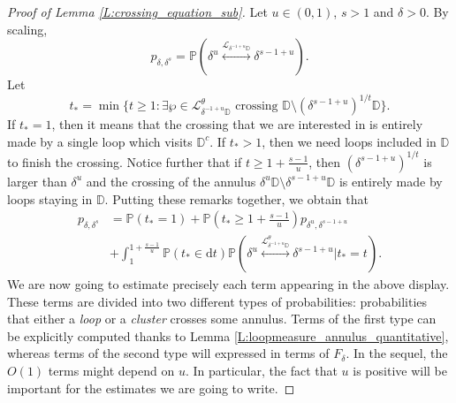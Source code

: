 \documentclass[10pt,a4paper]{amsart}
\newcommand{\D}{\mathbb{D}}
\newcommand{\Lc}{\mathcal{L}}
\newcommand{\Prob}[1]{\mathbb{P} \left( #1 \right) }
\renewcommand{\d}{\mathrm{d}}
\begin{document}
\begin{proof}[Proof of Lemma \ref{L:crossing_equation_sub}]
Let $u \in (0,1)$, $s>1$ and $\delta >0$. By scaling,
\[
p_{\delta,\delta^s} = \Prob{ \delta^u \overset{\Lc_{\delta^{-1+u} \D}}{\longleftrightarrow} \delta^{s-1+u} }.
\]
Let
\begin{equation}
t_* = \min \{ t \geq 1: \exists \wp \in \Lc_{ \delta^{-1+u} \D}^\theta \text{~crossing~} \D \setminus ( \delta^{s-1+u})^{1/t} \D \}.
\end{equation}
If $t_* =1$, then it means that the crossing that we are interested in is entirely made by a single loop which visits $\D^c$. If $t_* >1$, then we need loops included in $\D$ to finish the crossing. Notice further that if $t \geq 1 + \frac{s-1}{u}$, then $(\delta^{s-1+u})^{1/t}$ is larger than $\delta^u$ and the crossing of the annulus $\delta^u \D \setminus \delta^{s-1+u} \D$ is entirely made by loops staying in $\D$. Putting these remarks together, we obtain that
\begin{align*}
p_{\delta,\delta^s}
& = \Prob{ t_* = 1} + \Prob{t_* \geq 1 + \frac{s-1}{u} } p_{\delta^u, \delta^{s-1+u}} \\
& + \int_1^{1 + \frac{s-1}{u}} \Prob{ t_* \in \d t}
\Prob{ \delta^{u} \overset{\Lc_{\delta^{-1+u} \D}^\theta}{\longleftrightarrow} \delta^{s-1+u} \Big\vert t_* = t}.
\end{align*}
We are now going to estimate precisely each term appearing in the above display. These terms are divided into two different types of probabilities: probabilities that either a \emph{loop} or a \emph{cluster} crosses some annulus. Terms of the first type can be explicitly computed thanks to Lemma \ref{L:loopmeasure_annulus_quantitative}, whereas terms of the second type will expressed in terms of $F_\delta$.
In the sequel, the $O(1)$ terms might depend on $u$. In particular, the fact that $u$ is positive will be important for the estimates we are going to write.


\end{proof}
\end{document}
